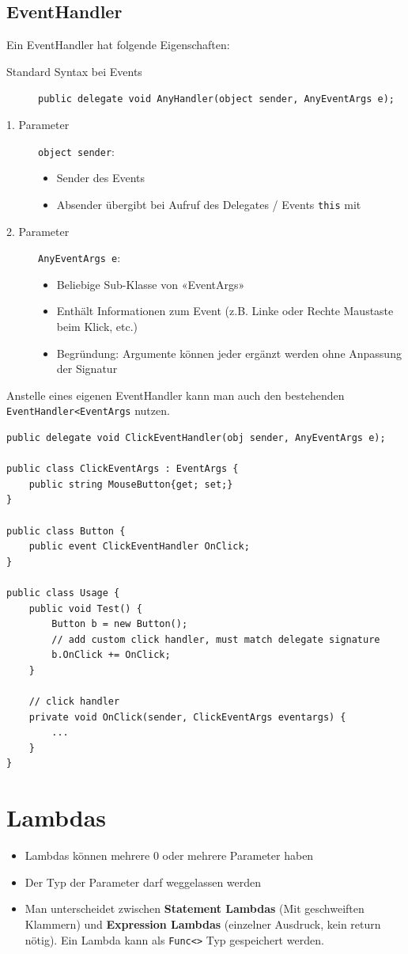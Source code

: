 \documentclass[
a4paper,
oneside,
10pt,
fleqn,
headsepline,
toc=listofnumbered, 
bibliography=totocnumbered]{scrartcl}
\let\stdsection\section
\renewcommand\section{\clearpage\stdsection}
\begin{document}
\subsection{EventHandler}
Ein EventHandler hat folgende Eigenschaften:
\begin{description}
    \item[Standard Syntax bei Events] \lstinline|public delegate void AnyHandler(object sender, AnyEventArgs e); |
    \item [1. Parameter] \lstinline|object sender|: 
    \begin{itemize}
        \item Sender des Events
        \item Absender übergibt bei Aufruf des Delegates / Events \lstinline|this| mit
    \end{itemize} 
    \item [2. Parameter] \lstinline|AnyEventArgs e|: 
    \begin{itemize}
        \item Beliebige Sub-Klasse von «EventArgs» 
        \item Enthält Informationen zum Event (z.B. Linke oder Rechte Maustaste beim Klick, etc.) 
        \item Begründung: Argumente können jeder ergänzt werden ohne Anpassung der Signatur 
    \end{itemize}
\end{description} 
    
Anstelle eines eigenen EventHandler kann man auch den bestehenden \lstinline|EventHandler<EventArgs| nutzen. 
\begin{lstlisting}[caption=C\# Event Handler]
public delegate void ClickEventHandler(obj sender, AnyEventArgs e);

public class ClickEventArgs : EventArgs {
	public string MouseButton{get; set;}
}

public class Button {
	public event ClickEventHandler OnClick;
}

public class Usage {
	public void Test() {
		Button b = new Button();
		// add custom click handler, must match delegate signature
		b.OnClick += OnClick;
	}
	
	// click handler
	private void OnClick(sender, ClickEventArgs eventargs) {
		...
	}
}
\end{lstlisting}

\section{Lambdas}
\begin{itemize}
	\item Lambdas können mehrere 0 oder mehrere Parameter haben
	\item Der Typ der Parameter darf weggelassen werden
	\item Man unterscheidet zwischen \textbf{Statement Lambdas} (Mit geschweiften Klammern) und \textbf{Expression Lambdas} (einzelner Ausdruck, kein return nötig). Ein Lambda kann als \lstinline|Func<>| Typ gespeichert werden. 
\end{itemize}
\end{document}
